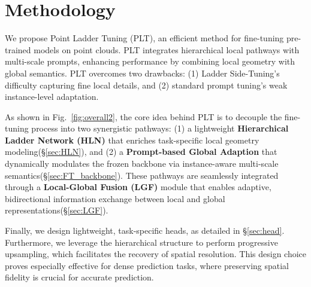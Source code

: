 


\section{Methodology}
\label{sec:methodology}


We propose Point Ladder Tuning (PLT), an efficient method for fine-tuning pre-trained models on point clouds. PLT integrates hierarchical local pathways with multi-scale prompts, enhancing performance by combining local geometry with global semantics. PLT overcomes two drawbacks: (1) Ladder Side-Tuning’s difficulty capturing fine local details, and (2) standard prompt tuning’s weak instance-level adaptation.

As shown in Fig.~\ref{fig:overall2}, the core idea behind PLT is to decouple the fine-tuning process into two synergistic pathways: (1) a lightweight \textbf{Hierarchical Ladder Network (HLN)} that enriches task-specific local geometry modeling(\S\ref{sec:HLN}), and (2) a \textbf{Prompt-based Global Adaption} that dynamically modulates the frozen backbone via instance-aware multi-scale semantics(\S\ref{sec:FT_backbone}). These pathways are seamlessly integrated through a \textbf{Local-Global Fusion (LGF)} module that enables adaptive, bidirectional information exchange between local and global representations(\S\ref{sec:LGF}).

Finally, we design lightweight, task-specific heads, as detailed in \S\ref{sec:head}. Furthermore, we leverage the hierarchical structure to perform progressive upsampling, which facilitates the recovery of spatial resolution. This design choice proves especially effective for dense prediction tasks, where preserving spatial fidelity is crucial for accurate prediction.

